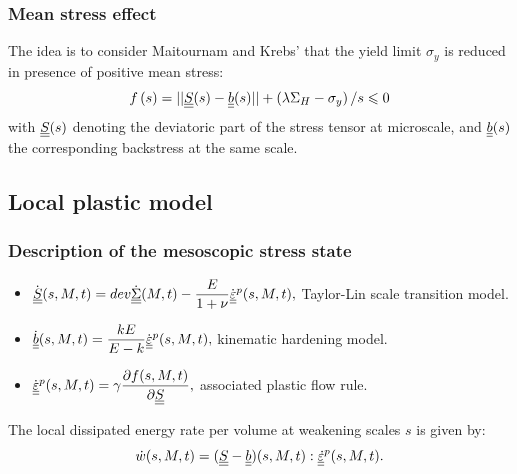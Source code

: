 \documentclass[xcolor=table]{Bredelebeamer}
\begin{document}
\begin{frame}
	\frametitle{Mean stress effect}	
The idea is to consider Maitournam and Krebs' that the yield limit $\sigma_y$ is reduced in presence of positive mean stress:
\begin{equation}
f\left(s\right)=||\uline{\uline{S}}(s)-\uline{\uline{b}}(s)||+\left( \lambda \Sigma_H-\sigma_y\right) /s\leqslant 0
\label{yieldfun}
\end{equation}
with $\uline{\uline{S}}(s)$ denoting the deviatoric part of the stress tensor at microscale, and $\uline{\uline{b}}(s)$ the corresponding backstress at the same scale.
\end{frame}	

\subsection{Local plastic model}
\begin{frame}
	\frametitle{Description of the mesoscopic stress state}	

\begin{itemize}
	\item $\dot{\uline{\uline{S}}}(s,M,t)=dev\dot{\uline{\uline{\Sigma}}}(M,t)-\dfrac{E}{1+\nu}\dot{\uline{\uline{\varepsilon}}}^p(s,M,t),$ Taylor-Lin scale transition model.

	\vspace{6pt}	
	\item
	$\dot{\uline{\uline{b}}}(s,M,t)=\dfrac{kE}{E-k} \dot{\uline{\uline{\varepsilon}}}^p(s,M,t),$  kinematic hardening model.

	\vspace{6pt}	
		\item
		$\dot{\uline{\uline{\varepsilon}}}^p(s,M,t)=\gamma\dfrac{\partial f(s,M,t)}{\partial \uline{\uline{S}}}, $ associated plastic flow rule.
\end{itemize}

	\vspace{6pt}
The local dissipated energy rate per volume at weakening scales $s$  is given by:
$$\dot{w}(s,M,t)=(\uline{\uline{S}}-\uline{\uline{b}})(s,M,t):\uline{\uline{\dot{\varepsilon}}}^p(s,M,t).$$ 
\end{frame}
\end{document}
